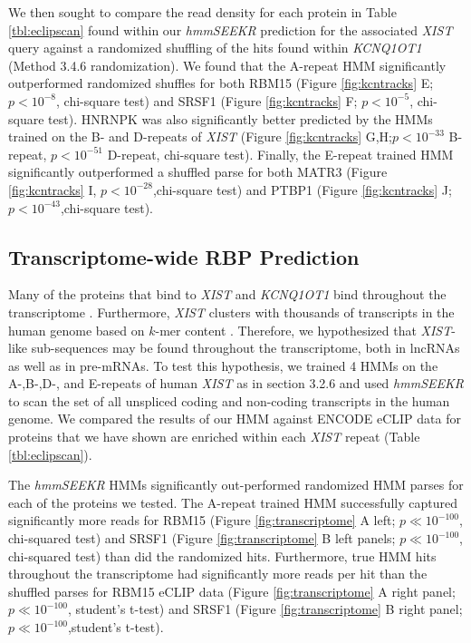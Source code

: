 We then sought to compare the read density for each protein in Table \ref{tbl:eclipscan} found within our \emph{hmmSEEKR} prediction for the associated \emph{XIST} query against a randomized shuffling of the hits found within \emph{KCNQ1OT1} (Method 3.4.6 randomization). We found that the A-repeat HMM significantly outperformed randomized shuffles for both RBM15 (Figure \ref{fig:kcntracks} E; $p< 10^{-8}$, chi-square test) and SRSF1 (Figure \ref{fig:kcntracks} F; $p< 10^{-5}$, chi-square test). HNRNPK was also significantly better predicted by the HMMs trained on the B- and D-repeats of \emph{XIST} (Figure \ref{fig:kcntracks} G,H;$p<10^{-33}$ B-repeat, $p<10^{-51}$ D-repeat, chi-square test). Finally, the E-repeat trained HMM significantly outperformed a shuffled parse for both MATR3 (Figure \ref{fig:kcntracks} I, $p<10^{-28}$,chi-square test) and PTBP1 (Figure \ref{fig:kcntracks} J; $p<10^{-43}$,chi-square test). 

\clearpage



\subsection{Transcriptome-wide RBP Prediction}
Many of the proteins that bind to \emph{XIST} and \emph{KCNQ1OT1} bind throughout the transcriptome \cite{VanNostrand2016RobusteCLIP}. Furthermore, \emph{XIST} clusters with thousands of transcripts in the human genome based on $k$-mer content \cite{Kirk2018FunctionalContent}. Therefore, we hypothesized that \emph{XIST}-like sub-sequences may be found throughout the transcriptome, both in lncRNAs as well as in pre-mRNAs. To test this hypothesis, we trained 4 HMMs on the A-,B-,D-, and E-repeats of human \emph{XIST} as in section 3.2.6 and used \emph{hmmSEEKR} to scan the set of all unspliced coding and non-coding transcripts in the human genome. We compared the results of our HMM against ENCODE eCLIP data for proteins that we have shown are enriched within each \emph{XIST} repeat (Table \ref{tbl:eclipscan}). 

The \emph{hmmSEEKR} HMMs significantly out-performed randomized HMM parses for each of the proteins we tested. The A-repeat trained HMM successfully captured significantly more reads for RBM15 (Figure \ref{fig:transcriptome} A left; $p\ll 10^{-100}$, chi-squared test) and SRSF1 (Figure \ref{fig:transcriptome} B left panels; $p\ll 10^{-100}$, chi-squared test) than did the randomized hits. Furthermore, true HMM hits throughout the transcriptome had significantly more reads per hit than the shuffled parses for RBM15 eCLIP data (Figure \ref{fig:transcriptome} A right panel; $p\ll10^{-100}$, student's t-test) and SRSF1 (Figure \ref{fig:transcriptome} B right panel; $p\ll10^{-100}$,student's t-test).

